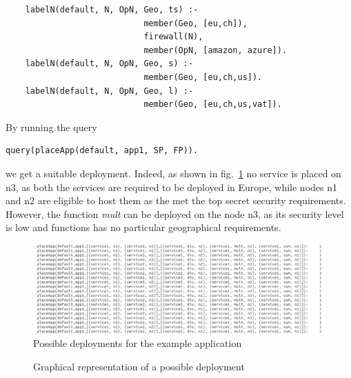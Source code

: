\documentclass[../DraftNotes.tex]{subfiles}
\begin{document}
\begin{verbatim}
	labelN(default, N, OpN, Geo, ts) :- 
                            member(Geo, [eu,ch]), 
                            firewall(N), 
                            member(OpN, [amazon, azure]).
	labelN(default, N, OpN, Geo, s) :- 
                            member(Geo, [eu,ch,us]).
	labelN(default, N, OpN, Geo, l) :- 
                            member(Geo, [eu,ch,us,vat]).

\end{verbatim}

By running the query

\begin{verbatim}
query(placeApp(default, app1, SP, FP)).
\end{verbatim}

we get a suitable deployment. Indeed, as shown in fig.~\ref{fig:Prel_deployment} no service is placed on n3, as both the services are required to be deployed in Europe, while nodes n1 and n2 are eligible to host them as the met the top secret security requirements. However, the function \emph{mult} can be deployed on the node n3, as its security level is low and functions has no particular geographical requirements.

\begin{figure}
	\begin{center}
	\includegraphics[scale=0.3]{sections/sect_images/Prel_results.png}
	\caption{Possible deployments for the example application}
  	\label{fig:Prel_deployment}
  	\end{center}
\end{figure}

\begin{figure}
	\begin{center}
	\caption{Graphical representation of a possible deployment}
  	\label{fig:Graph_deployment}
  	\end{center}
\end{figure}
\end{document}
